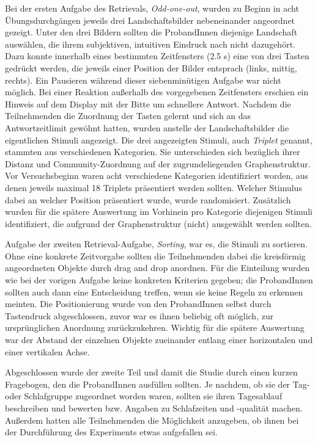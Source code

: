 Bei der ersten Aufgabe des Retrievals, \textit{Odd-one-out}, wurden zu Beginn in acht Übungsdurchgängen jeweils drei Landschaftsbilder nebeneinander angeordnet gezeigt. Unter den drei Bildern sollten die ProbandInnen diejenige Landschaft auswählen, die ihrem subjektiven, intuitiven Eindruck nach nicht dazugehört. Dazu konnte innerhalb eines bestimmten Zeitfensters (2.5 s) eine von drei Tasten gedrückt werden, die jeweils einer Position der Bilder entsprach (links, mittig, rechts). Ein Pausieren während dieser siebenminütigen Aufgabe war nicht möglich. Bei einer Reaktion außerhalb des vorgegebenen Zeitfensters erschien ein Hinweis auf dem Display mit der Bitte um schnellere Antwort. Nachdem die Teilnehmenden die Zuordnung der Tasten gelernt und sich an das Antwortzeitlimit gewöhnt hatten, wurden anstelle der Landschaftsbilder die eigentlichen Stimuli angezeigt. Die drei angezeigten Stimuli, auch \textit{Triplet} genannt, stammten aus verschiedenen Kategorien. Sie unterschieden sich bezüglich ihrer Distanz und Community-Zuordnung auf der zugrundeliegenden Graphenstruktur. Vor Versuchsbeginn waren acht verschiedene Kategorien identifiziert worden, aus denen jeweils maximal 18 Triplets präsentiert werden sollten. Welcher Stimulus dabei an welcher Position präsentiert wurde, wurde randomisiert. Zusätzlich wurden für die spätere Auswertung im Vorhinein pro Kategorie diejenigen Stimuli identifiziert, die aufgrund der Graphenstruktur (nicht) ausgewählt werden sollten.

Aufgabe der zweiten Retrieval-Aufgabe, \textit{Sorting}, war es, die Stimuli zu sortieren. Ohne eine konkrete Zeitvorgabe sollten die Teilnehmenden dabei die kreisförmig angeordneten Objekte durch drag and drop anordnen. Für die Einteilung wurden wie bei der vorigen Aufgabe keine konkreten Kriterien gegeben; die ProbandInnen sollten auch dann eine Entscheidung treffen, wenn sie keine Regeln zu erkennen meinten. Die Positionierung wurde von den ProbandInnen selbst durch Tastendruck abgeschlossen, zuvor war es ihnen beliebig oft möglich, zur ursprünglichen Anordnung zurückzukehren. Wichtig für die spätere Auswertung war der Abstand der einzelnen Objekte zueinander entlang einer horizontalen und einer vertikalen Achse.

Abgeschlossen wurde der zweite Teil und damit die Studie durch einen kurzen Fragebogen, den die ProbandInnen ausfüllen sollten. Je nachdem, ob sie der Tag- oder Schlafgruppe zugeordnet worden waren, sollten sie ihren Tagesablauf beschreiben und bewerten bzw. Angaben zu Schlafzeiten und -qualität machen. Außerdem hatten alle Teilnehmenden die Möglichkeit anzugeben, ob ihnen bei der Durchführung des Experiments etwas aufgefallen sei.

